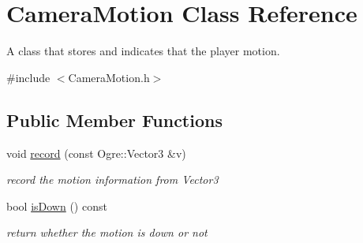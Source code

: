 \hypertarget{class_camera_motion}{}\section{Camera\+Motion Class Reference}
\label{class_camera_motion}


A class that stores and indicates that the player motion.  




{\ttfamily \#include $<$Camera\+Motion.\+h$>$}

\subsection*{Public Member Functions}
\begin{DoxyCompactItemize}
\item 
void \hyperlink{class_camera_motion_a2a388dd7c3bc04330a6b421d198d0548}{record} (const Ogre\+::\+Vector3 \&v)\hypertarget{class_camera_motion_a2a388dd7c3bc04330a6b421d198d0548}{}\label{class_camera_motion_a2a388dd7c3bc04330a6b421d198d0548}

\begin{DoxyCompactList}\small\item\em record the motion information from Vector3 \end{DoxyCompactList}\item 
bool \hyperlink{class_camera_motion_a66657c2fe27ad0aeb400dacf59cd5184}{is\+Down} () const \hypertarget{class_camera_motion_a66657c2fe27ad0aeb400dacf59cd5184}{}\label{class_camera_motion_a66657c2fe27ad0aeb400dacf59cd5184}

\begin{DoxyCompactList}\small\item\em return whether the motion is down or not \end{DoxyCompactList}\end{DoxyCompactItemize}
